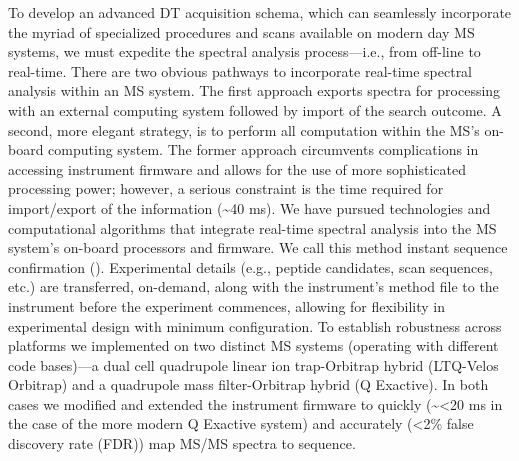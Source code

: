 To develop an advanced DT acquisition schema, which can seamlessly incorporate the myriad of specialized procedures and scans available on modern day MS systems, we must expedite the spectral analysis process---i.e., from off-line to real-time. There are two obvious pathways to incorporate real-time spectral analysis within an MS system. The first approach exports spectra for processing with an external computing system followed by import of the search outcome.\cite{mqrt} A second, more elegant strategy, is to perform all computation within the MS's on-board computing system.\cite{transform} The former approach circumvents complications in accessing instrument firmware and allows for the use of more sophisticated processing power; however, a serious constraint is the time required for import/export of the information (\textasciitilde40 ms). We have pursued technologies and computational algorithms that integrate real-time spectral analysis into the MS system's on-board processors and firmware. We call this method instant sequence confirmation (\inseq{}). Experimental details (e.g., peptide candidates, scan sequences, etc.) are transferred, on-demand, along with the instrument's method file to the instrument before the experiment commences, allowing for flexibility in experimental design with minimum configuration. To establish robustness across platforms we implemented \inseq{} on two distinct MS systems (operating with different code bases)---a dual cell quadrupole linear ion trap-Orbitrap hybrid (LTQ-Velos Orbitrap) and a quadrupole mass filter-Orbitrap hybrid (Q Exactive). In both cases we modified and extended the instrument firmware to quickly (\textasciitilde<20 ms in the case of the more modern Q Exactive system) and accurately (<2\% false discovery rate (FDR)) map MS/MS spectra to sequence.
